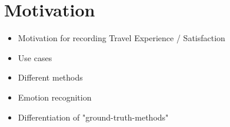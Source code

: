 \section{Motivation}\label{sec:motivation}

\begin{itemize}
    \item Motivation for recording Travel Experience / Satisfaction
    \item Use cases \cite{what_if_your_car_would_care}
    \item Different methods
    \item Emotion recognition \cite{facial_emotion_recognition} \cite{vemotion} \cite{affective_automotive_user_interfaces} \cite{happy_or_scared} \cite{emotion_sensing_for_ebike_safety} \cite{driver_emotion_recognition_survey} \cite{towards_empathetic_car_interfaces}
    \item Differentiation of "ground-truth-methods"
\end{itemize}
